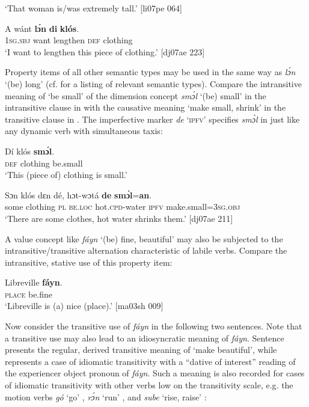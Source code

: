 \glt ‘That woman is/was extremely tall.’ [li07pe 064]
\z


\ea%
    \label{ex:key:1117}
    \gll \MakeUppercase{A}   wánt  \textbf{lɔ́n}      \textbf{di}  \textbf{klós}.\\
\textsc{1sg.sbj}  want  lengthen    \textsc{def}  clothing\\

\glt ‘I want to lengthen this piece of clothing.’ [dj07ae 223]
\z

Property items of all other semantic types may be used in the same way as \textit{lɔ́n} ‘(be) long’ (cf.  for a listing of relevant semantic types). Compare the intransitive meaning of ‘be small’ of the dimension concept \textit{smɔ́l} ‘(be) small’ in the intransitive clause in  with the causative meaning ‘make small, shrink’ in the transitive clause in . The imperfective marker \textit{de} ‘\textsc{ipfv}’ specifies \textit{smɔ́l} in  just like any dynamic verb with simultaneous taxis:


\ea%
    \label{ex:key:1118}
    \gll Dí  klós    \textbf{smɔ́l}.\\
\textsc{def}  clothing  be.small\\

\glt ‘This (piece of) clothing is small.’
\z


\ea%
    \label{ex:key:1119}
    \gll Sɔn    klós    dɛn  dé,    hɔt-wɔtá      \textbf{de}  \textbf{smɔ́l}=\textbf{an}.\\
some  clothing  \textsc{pl}  \textsc{be.loc}  hot.\textsc{cpd}{}-water    \textsc{ipfv}  make.small=\textsc{3sg.obj}\\

\glt ‘There are some clothes, hot water shrinks them.’ [dj07ae 211]
\z

A value concept like \textit{fáyn} ‘(be) fine, beautiful’ may also be subjected to the intransitive/transitive alternation characteristic of labile verbs. Compare the intransitive, stative use of this property item: 


\ea%
    \label{ex:key:1120}
    \gll Libreville  \textbf{fáyn}.\\
\textsc{place}    be.fine\\

\glt ‘Libreville is (a) nice (place).’ [ma03sh 009]
\z

Now consider the transitive use of \textit{fáyn} in the following two sentences. Note that a transitive use may also lead to an idiosyncratic meaning of \textit{fáyn}. Sentence  presents the regular, derived transitive meaning of ‘make beautiful’, while  represents a case of idiomatic transitivity with a “dative of interest” reading of the experiencer object pronoun of \textit{fáyn}. Such a meaning is also recorded for cases of idiomatic transitivity with other verbs low on the transitivity scale, e.g. the motion verbs \textit{gó} ‘go’ , \textit{rɔ́n} ‘run’ , and \textit{sube} ‘rise, raise’ :

